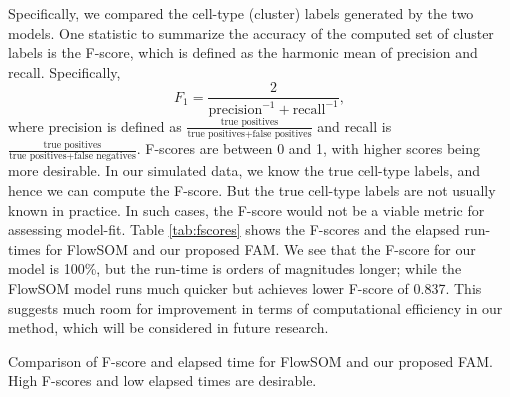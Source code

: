 \documentclass[12pt,]{article}
\begin{document}
Specifically, we compared the
cell-type (cluster) labels generated by the two models.
One statistic to summarize the accuracy of the computed set of cluster labels
is the F-score, which is defined as the harmonic mean of precision and recall.
Specifically,
$$
F_1 = \frac{2}{\text{precision}^{-1} + \text{recall}^{-1}},
$$
where precision is defined as $\frac{\text{true positives}}{\text{true
positives} + \text{false positives}}$ and recall is $\frac{\text{true
positives}}{\text{true positives} + \text{false negatives}}$.  F-scores are
between 0 and 1, with higher scores being more desirable. In our simulated
data, we know the true cell-type labels, and hence we can compute the F-score.
But the true cell-type labels are not usually known in practice. In such cases,
the F-score would not be a viable metric for assessing model-fit.  Table \ref{tab:fscores} shows the F-scores and the elapsed run-times for
FlowSOM and our proposed FAM.  We see that the F-score for our model is 100\%,
but the run-time is orders of magnitudes longer; while the FlowSOM model runs
much quicker but achieves lower F-score of 0.837. This suggests much
room for improvement in terms of computational efficiency in our method, which
will be considered in future research.


\begin{table}[H]
\centering

\label{tab:fscores}
\caption{Comparison of F-score and elapsed time for FlowSOM and our proposed
FAM. High F-scores and low elapsed times are desirable.}
\end{table}

\end{document}
